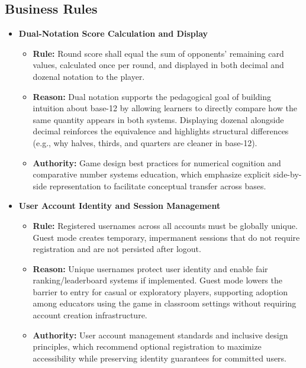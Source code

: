 \documentclass[12pt]{article}
\begin{document}
\subsection{Business Rules}

\begin{itemize}
    \item \textbf{Dual-Notation Score Calculation and Display}
    \begin{itemize}
        \item \textbf{Rule:} Round score shall equal the sum of opponents' remaining card values, calculated once per round, and displayed in both decimal and dozenal notation to the player.
        \item \textbf{Reason:} Dual notation supports the pedagogical goal of building intuition about base-12 by allowing learners to directly compare how the same quantity appears in both systems. Displaying dozenal alongside decimal reinforces the equivalence and highlights structural differences (e.g., why halves, thirds, and quarters are cleaner in base-12).
        \item \textbf{Authority:} Game design best practices for numerical cognition and comparative number systems education, which emphasize explicit side-by-side representation to facilitate conceptual transfer across bases.
    \end{itemize}
    
    \item \textbf{User Account Identity and Session Management}
    \begin{itemize}
        \item \textbf{Rule:} Registered usernames across all accounts must be globally unique. Guest mode creates temporary, impermanent sessions that do not require registration and are not persisted after logout.
        \item \textbf{Reason:} Unique usernames protect user identity and enable fair ranking/leaderboard systems if implemented. Guest mode lowers the barrier to entry for casual or exploratory players, supporting adoption among educators using the game in classroom settings without requiring account creation infrastructure.
        \item \textbf{Authority:} User account management standards and inclusive design principles, which recommend optional registration to maximize accessibility while preserving identity guarantees for committed users.
    \end{itemize}
    

\end{itemize}
\end{document}
